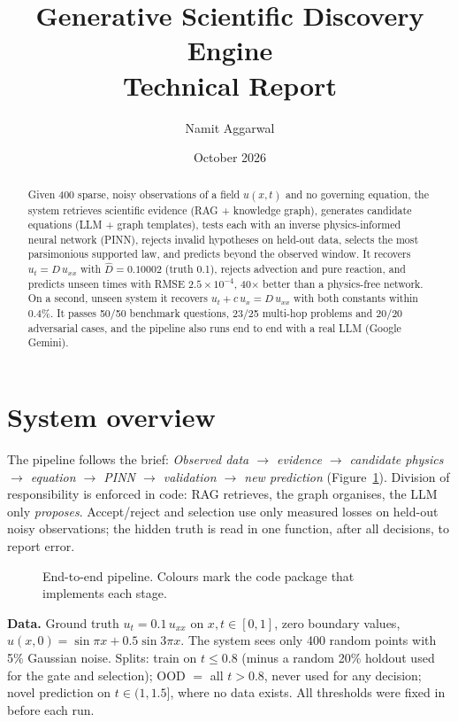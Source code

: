 \documentclass[11pt,a4paper]{article}
\title{\textbf{Generative Scientific Discovery Engine}\\[3pt]\large Technical Report}
\author{Namit Aggarwal}
\date{October 2026}
\begin{document}
\maketitle
\vspace{-6mm}

\begin{abstract}
\noindent Given 400 sparse, noisy observations of a field $u(x,t)$ and no governing equation, the system retrieves
scientific evidence (RAG + knowledge graph), generates candidate equations (LLM + graph templates), tests each with an
inverse physics-informed neural network (PINN), rejects invalid hypotheses on held-out data, selects the most
parsimonious supported law, and predicts beyond the observed window. It recovers $u_t = D\,u_{xx}$ with
$\hat D = 0.10002$ (truth 0.1), rejects advection and pure reaction, and predicts unseen times with RMSE
$2.5\times10^{-4}$, 40$\times$ better than a physics-free network. On a second, unseen system it recovers
$u_t + c\,u_x = D\,u_{xx}$ with both constants within 0.4\%. It passes 50/50 benchmark questions, 23/25 multi-hop
problems and 20/20 adversarial cases, and the pipeline also runs end to end with a real LLM (Google Gemini).
\end{abstract}

\section{System overview}

The pipeline follows the brief: \emph{Observed data $\to$ evidence $\to$ candidate physics $\to$ equation $\to$ PINN
$\to$ validation $\to$ new prediction} (Figure~\ref{fig:pipeline}). Division of responsibility is enforced in code:
RAG retrieves, the graph organises, the LLM only \emph{proposes}. Accept/reject and selection use only measured losses
on held-out noisy observations; the hidden truth is read in one function, after all decisions, to report error.

\begin{figure}[!tbp]
\centering
\scalebox{0.85}{}
\caption{End-to-end pipeline. Colours mark the code package that implements each stage.}
\label{fig:pipeline}
\end{figure}

\textbf{Data.} Ground truth $u_t = 0.1\,u_{xx}$ on $x,t\in[0,1]$, zero boundary values,
$u(x,0)=\sin\pi x + 0.5\sin 3\pi x$. The system sees only 400 random points with 5\% Gaussian noise. Splits: train on
$t\le0.8$ (minus a random 20\% holdout used for the gate and selection); OOD $=$ all $t>0.8$, never used for any
decision; novel prediction on $t\in(1,1.5]$, where no data exists. All thresholds were fixed in 
before each run.
\end{document}

